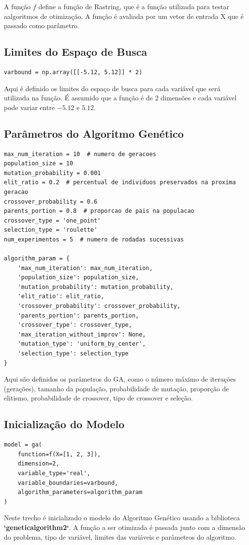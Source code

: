 \documentclass[a4paper, 12pt]{article}
\begin{document}
A função $f$ define a função de Rastring, que é a função utilizada para testar aalgoritmos de otimização. A função é avaliada por um vetor de entrada X que é passado como parâmetro.\\

\subsection{Limites do Espaço de Busca}

\begin{lstlisting}[style=python]
varbound = np.array([[-5.12, 5.12]] * 2)
\end{lstlisting}

Aqui é definido os limites do espaço de busca para cada variável que será utilizada na função. É assumido que a função é de 2 dimensões e cada variável pode variar entre $-5.12$ e $5.12$. \\

\subsection{Parâmetros do Algoritmo Genético}

\begin{lstlisting}[style=python]
max_num_iteration = 10  # numero de geracoes
population_size = 10
mutation_probability = 0.001
elit_ratio = 0.2  # percentual de individuos preservados na proxima geracao
crossover_probability = 0.6
parents_portion = 0.8  # proporcao de pais na populacao
crossover_type = 'one_point'
selection_type = 'roulette'
num_experimentos = 5  # numero de rodadas sucessivas

algorithm_param = {
    'max_num_iteration': max_num_iteration,
    'population_size': population_size,
    'mutation_probability': mutation_probability,
    'elit_ratio': elit_ratio,
    'crossover_probability': crossover_probability,
    'parents_portion': parents_portion,
    'crossover_type': crossover_type,
    'max_iteration_without_improv': None,
    'mutation_type': 'uniform_by_center',
    'selection_type': selection_type
}
\end{lstlisting}
Aqui são definidos os parâmetros do GA, como o número máximo de iterações (gerações), tamanho da população, probabilidade de mutação, proporção de elitismo, probabilidade de crossover, tipo de crossover e seleção.\\

\subsection{Inicialização do Modelo}
\begin{lstlisting}[style=python]
model = ga(
    function=f(X=[1, 2, 3]),
    dimension=2,
    variable_type='real',
    variable_boundaries=varbound,
    algorithm_parameters=algorithm_param
)
\end{lstlisting}
Neste trecho é inicializado o modelo do Algoritmo Genético usando a biblioteca \textbf{`geneticalgorithm2`}. A função a ser otimizada é passada junto com a dimensão do problema, tipo de variável, limites das variáveis e parâmetros do algoritmo.\\
\end{document}
